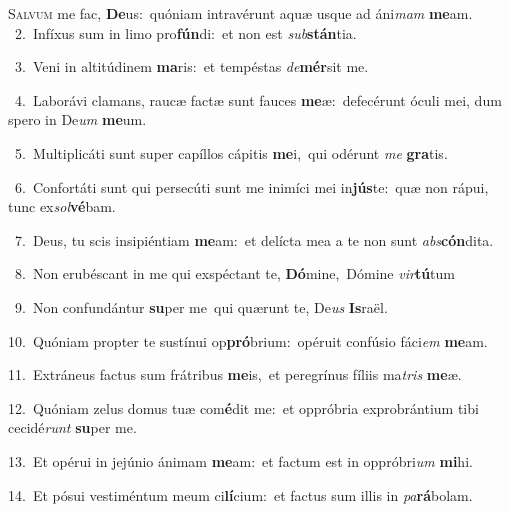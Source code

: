 \lettrine{\initial\textcolor{\initialcolor}{S}}{alvum} me fac, \textbf{De}\-us:~\star quóniam intravérunt aquæ usque ad áni\textit{mam} \textbf{me}\-am.\\
{\numbfont\textcolor{\numbcolor}{~2.}}~Infíxus sum in limo pro\-\textbf{fún}\-di:~\star et non est \textit{sub}\-\textbf{stán}tia.\par
{\numbfont\textcolor{\numbcolor}{~3.}}~Veni in altitúdinem \textbf{ma}\-ris:~\star et tempéstas \textit{de}\-\textbf{mér}sit me.\par
{\numbfont\textcolor{\numbcolor}{~4.}}~Laborávi clamans, raucæ factæ sunt fauces \textbf{me}\-æ:~\star defecérunt óculi mei, dum spero in De\textit{um} \textbf{me}\-um.\par
{\numbfont\textcolor{\numbcolor}{~5.}}~Multiplicáti sunt super capíllos cápitis \textbf{me}\-i,~\star qui odérunt \textit{me} \textbf{gra}\-tis.\par
{\numbfont\textcolor{\numbcolor}{~6.}}~Confortáti sunt qui persecúti sunt me inimíci mei in\-\textbf{jús}\-te:~\star quæ non rápui, tunc ex\-\textit{sol}\-\textbf{vé}bam.\par
{\numbfont\textcolor{\numbcolor}{~7.}}~Deus, tu scis insipiéntiam \textbf{me}\-am:~\star et delícta mea a te non sunt \textit{abs}\-\textbf{cón}dita.\par
{\numbfont\textcolor{\numbcolor}{~8.}}~Non erubéscant in me qui exspéctant te, \textbf{Dó}\-mine,~\star Dómine \textit{vir}\-\textbf{tú}tum\par
{\numbfont\textcolor{\numbcolor}{~9.}}~Non confundántur \textbf{su}\-per me~\star qui quærunt te, De\textit{us} \textbf{Is}\-raël.\par
{\numbfont\textcolor{\numbcolor}{10.}}~Quóniam propter te sustínui op\-\textbf{pró}\-brium:~\star opéruit confúsio fáci\textit{em} \textbf{me}\-am.\par
{\numbfont\textcolor{\numbcolor}{11.}}~Extráneus factus sum frátribus \textbf{me}\-is,~\star et peregrínus fíliis ma\textit{tris} \textbf{me}\-æ.\par
{\numbfont\textcolor{\numbcolor}{12.}}~Quóniam zelus domus tuæ com\-\textbf{é}\-dit me:~\star et oppróbria exprobrántium tibi cecidé\textit{runt} \textbf{su}\-per me.\par
{\numbfont\textcolor{\numbcolor}{13.}}~Et opérui in jejúnio ánimam \textbf{me}\-am:~\star et factum est in oppróbri\textit{um} \textbf{mi}\-hi.\par
{\numbfont\textcolor{\numbcolor}{14.}}~Et pósui vestiméntum meum ci\-\textbf{lí}\-cium:~\star et factus sum illis in \textit{pa}\-\textbf{rá}bolam.\par
